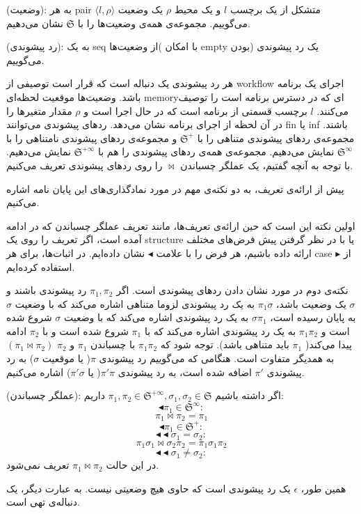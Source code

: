 \begin{defn}
	(وضعیت): به هر \gls*{pair} متشکل از یک برچسب $l$ و یک محیط $\rho$ یک وضعیت  
	$\langle l , \rho \rangle$
	می‌گوییم. مجموعه‌ی همه‌ی وضعیت‌ها را با $\mathfrak{S}$ نشان می‌دهیم.
\end{defn}
\begin{defn}
	(رد پیشوندی): به یک \gls*{seq} از وضعیت‌ها( با امکان \gls*{empty} بودن) یک رد پیشوندی می‌گوییم.
\end{defn}

هر رد پیشوندی یک دنباله است که قرار است توصیفی از \gls{workflow} اجرای یک برنامه باشد. وضعیت‌ها موقعیت لحظه‌ای \gls*{memory}ا‌ی که در دسترس برنامه است را توصیف می‌کنند. $l$ برچسب قسمتی از برنامه‌ است که در حال اجرا است و $\rho$ مقدار متغیر‌ها را در آن لحظه از اجرای برنامه نشان می‌دهد. ردهای پیشوندی می‌توانند \gls*{fin} یا \gls*{inf} باشند. مجموعه‌ی ردهای پیشوندی‌ متناهی را با $\mathfrak{S^+}$ و مجموعه‌ی ردهای پیشوندی نامتناهی را با  $\mathfrak{S^\infty}$ نمایش می‌دهیم. مجموعه‌ی همه‌ی ردهای پیشوندی را هم با $\mathfrak{S^{+\infty}}$ نمایش می‌دهیم. 
با توجه به آنچه گفتیم، یک عملگر چسباندن $\Join$ را روی ردهای پیشوندی تعریف می‌کنیم. 

پیش از ارائه‌ی تعریف، به دو نکته‌ی مهم در مورد نمادگذاری‌های این پایان نامه اشاره می‌کنیم.

اولین نکته این است که حین ارائه‌ی تعریف‌ها، مانند تعریف عملگر چسباندن که در ادامه آمده است، اگر تعریف را روی یک \gls*{structure} یا با در نظر گرفتن پیش فرض‌های مختلف ارائه داده باشیم، هر فرض را با علامت 
$\blacktriangleleft$
نشان داده‌ایم. در اثبات‌ها، برای هر \gls*{case} از 
$\blacktriangleright$
استفاده کرده‌ایم. 

نکته‌ی دوم در مورد نشان دادن ردهای پیشوندی است. اگر $\pi_1,\pi_2$ رد پیشوندی باشند و $\sigma$ یک وضعیت باشد، $\pi_1\sigma$ به یک رد پیشوندی لزوما متناهی اشاره می‌کند که با وضعیت $\sigma$ به پایان رسیده است،
$\sigma\pi_1$
به یک رد پیشوندی اشاره می‌کند که با وضعیت $\sigma$ شروع شده است و $\pi_1\pi_2$ به یک رد پیشوندی اشاره می‌کند که با $\pi_1$ شروع شده است و با $\pi_2$ ادامه پیدا می‌کند( $\pi_1$ باید متناهی باشد). توجه شود که $\pi_1\pi_2$ با چسباندن $\pi_1$ و $\pi_2$ $(\pi_1 \Join \pi_2)$به همدیگر متفاوت است. هنگامی که می‌گوییم رد پیشوندی $\pi$( یا موقعیت $\sigma$) به رد پیشوندی $\pi'$ اضافه شده است، به رد پیشوندی $\pi'\pi$( یا $\pi'\sigma$) اشاره می‌کنیم.

\begin{defn}
	(عملگر چسباندن): اگر داشته باشیم 
	$\pi_1 , \pi_2 \in \mathfrak{S^{+\infty}}  , \sigma_1 ,\sigma_2 \in \mathfrak{S}$
	داریم:
		$$\blacktriangleleft \pi_1 \in \mathfrak{S}^\infty:$$
		$$\pi_1 \Join \pi_2 = \pi_1$$
		$$\blacktriangleleft \pi_1 \in \mathfrak{S}^+:$$
		$$\blacktriangleleft \blacktriangleleft \sigma_1 = \sigma_2:$$
		$$\pi_1\sigma_1 \Join \sigma_2 \pi_2 = \pi_1 \sigma_1 \pi_2$$
		$$\blacktriangleleft \blacktriangleleft \sigma_1 \neq \sigma_2:$$
		در این حالت 
		$\pi_1 \Join \pi_2$
		تعریف نمی‌شود.
\end{defn}
همین طور، $\epsilon$ یک رد پیشوندی است که حاوی هیچ وضعیتی نیست. به عبارت دیگر، یک دنباله‌ی تهی است.

